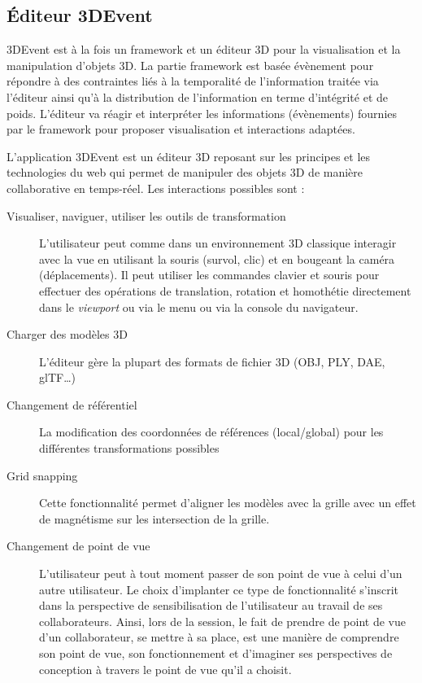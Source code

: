 \subsection{Éditeur 3DEvent}
3DEvent est à la fois un \gls{framework} et un éditeur 3D pour la visualisation et la 
manipulation d'objets 3D. La partie \gls{framework} est basée évènement pour 
répondre à des contraintes liés à la temporalité de l'information traitée via l'éditeur 
ainsi qu'à la distribution de l'information en terme d'intégrité et de poids. L'éditeur 
va réagir et interpréter les informations (évènements) fournies par le 
\gls{framework} pour proposer visualisation et interactions adaptées.

 L'application 3DEvent est un 
éditeur 3D reposant sur les principes et les technologies du web qui permet de 
manipuler des objets 3D de manière 
collaborative en temps-réel. Les interactions possibles sont : 
\begin{description}
	
	\item[Visualiser, naviguer, utiliser les outils de transformation] L'utilisateur peut 
	com\-me dans un environnement 3D classique interagir avec la vue en utilisant 
	la souris (survol, clic) et en bougeant la caméra (déplacements). Il peut 
	utiliser les commandes clavier et souris pour effectuer des opérations de 
	translation, rotation et homothétie directement dans le \textit{viewport} ou via le 
	menu ou via la console du navigateur.
	\item[Charger des modèles 3D] L'éditeur gère la plupart des formats de fichier 
	3D (OBJ, PLY, DAE, glTF\ldots)
	\item[Changement de référentiel] La modification des coordonnées de 
	réfé\-ren\-ces (local/global)  pour les différentes transformations possibles
	\item[Grid snapping] Cette fonctionnalité permet d'aligner les modèles avec la 
	grille avec un effet de magnétisme sur les intersection de la grille.
	\item[Changement de point de vue] L'utilisateur peut à tout moment passer de 
	son point de vue à celui d'un autre utilisateur. Le choix d'implanter ce type de 
	fonctionnalité s'inscrit dans la perspective de sensibilisation de l'utilisateur au 
	travail de ses collaborateurs. Ainsi, lors de la session, le fait de prendre de 
	point de vue d'un collaborateur, se mettre à sa place, est une manière de 
	comprendre son point de vue, son fonctionnement et d'imaginer ses 
	perspectives de conception à travers le point de vue qu'il a choisit.
\end{description}


